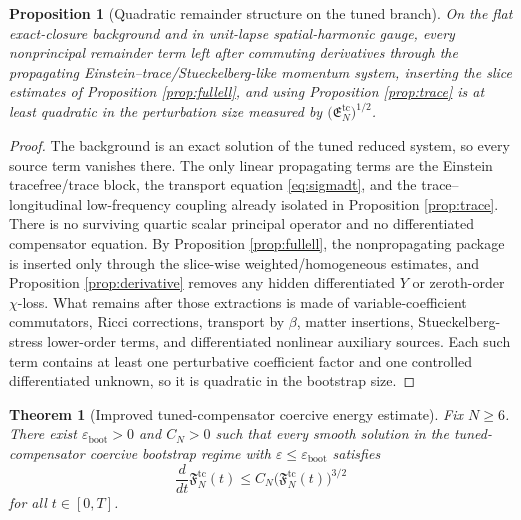 \documentclass[11pt]{article}
\newtheorem{proposition}{Proposition}
\newtheorem{theorem}{Theorem}
\begin{document}
\begin{proposition}[Quadratic remainder structure on the tuned branch]
\label{prop:quadratic}
On the flat exact-closure background and in unit-lapse spatial-harmonic gauge, every nonprincipal remainder term left after commuting derivatives through the propagating Einstein--trace/Stueckelberg-like momentum system, inserting the slice estimates of Proposition \ref{prop:fullell}, and using Proposition \ref{prop:trace} is at least quadratic in the perturbation size measured by \(\bigl(\mathfrak E_N^{\mathrm{tc}}\bigr)^{1/2}\).
\end{proposition}

\begin{proof}
The background is an exact solution of the tuned reduced system, so every source term vanishes there. The only linear propagating terms are the Einstein tracefree/trace block, the transport equation \eqref{eq:sigmadt}, and the trace--longitudinal low-frequency coupling already isolated in Proposition \ref{prop:trace}. There is no surviving quartic scalar principal operator and no differentiated compensator equation. By Proposition \ref{prop:fullell}, the nonpropagating package is inserted only through the slice-wise weighted/homogeneous estimates, and Proposition \ref{prop:derivative} removes any hidden differentiated \(Y\) or zeroth-order \(\chi\)-loss. What remains after those extractions is made of variable-coefficient commutators, Ricci corrections, transport by \(\beta\), matter insertions, Stueckelberg-stress lower-order terms, and differentiated nonlinear auxiliary sources. Each such term contains at least one perturbative coefficient factor and one controlled differentiated unknown, so it is quadratic in the bootstrap size.
\end{proof}

\begin{theorem}[Improved tuned-compensator coercive energy estimate]
\label{thm:ineq}
Fix \(N\ge 6\). There exist \(\varepsilon_{\mathrm{boot}}>0\) and \(C_N>0\) such that every smooth solution in the tuned-compensator coercive bootstrap regime with \(\varepsilon\le \varepsilon_{\mathrm{boot}}\) satisfies
\begin{equation}
\frac{d}{dt}\mathfrak F_N^{\mathrm{tc}}(t)
\le
C_N\bigl(\mathfrak F_N^{\mathrm{tc}}(t)\bigr)^{3/2}
\label{eq:quadraticineq}
\end{equation}
for all \(t\in[0,T]\).
\end{theorem}
\end{document}
